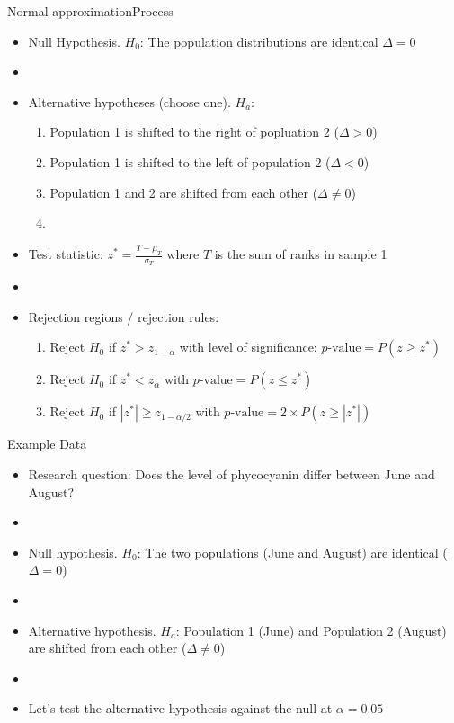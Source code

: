\documentclass[xcolor=dvipsnames]{beamer}
\begin{document}
\begin{frame}{Normal approximation}{Process}
\begin{itemize}
	\item Null Hypothesis. $H_0$: The population distributions are identical $\Delta = 0$
	\item[]
	\item Alternative hypotheses (choose one). $H_a$:
	\begin{enumerate}
		\item Population 1 is shifted to the right of popluation 2 ($\Delta >0$)
		\item Population 1 is shifted to the left of population 2 ($\Delta < 0$)
		\item Population 1 and 2 are shifted from each other ($\Delta \neq 0$)
		\item[]
	\end{enumerate}
	\item Test statistic: $z^* =\frac{T- \mu_T}{\sigma_T}$ where $T$ is the sum of ranks in sample 1
	\item[]
	\item Rejection regions / rejection rules:
	\begin{enumerate}
		\item Reject $H_0$ if $z^* > z_{1-\alpha}$ with level of significance: $p\text{-value}=P(z \geq z^*)$
		\item Reject $H_0$ if $z^* < z_{\alpha}$ with $p\text{-value}=P(z \leq z^*)$
		\item Reject $H_0$ if $|z^*| \geq z_{1-\alpha/2}$ with $p\text{-value}=2 \times P(z \geq |z^*|)$
	\end{enumerate}
\end{itemize}
\end{frame}

\begin{frame}{Example Data}
\begin{itemize}
	\item Research question: Does the level of phycocyanin differ between June and August?
	\item[]
	\item Null hypothesis. $H_0$: The two populations (June and August) are identical ($\Delta = 0$)
	\item[]
	\item Alternative hypothesis. $H_a$: Population 1 (June) and Population 2 (August) are shifted from each other ($\Delta \neq 0$)
	\item[]
	\item Let's test the alternative hypothesis against the null at $\alpha = 0.05$
\end{itemize}
\end{frame}
\end{document}
